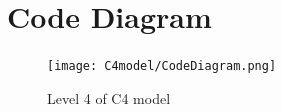 \documentclass[a4paper, 11pt]{article}
\begin{document}
\section{Code Diagram}

\begin{figure}[H]
  \texttt{[image: C4model/CodeDiagram.png]}
  \caption{Level 4 of C4 model}
  \label{fig:Level 4 of C4 model}
\end{figure}



\pagebreak
\end{document}
